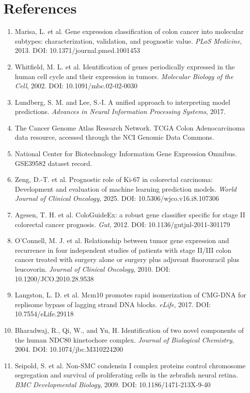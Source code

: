 \documentclass[11pt]{article}
\begin{document}
\section{References}
\begin{enumerate}
    \item Marisa, L. et al. Gene expression classification of colon cancer into molecular subtypes: characterization, validation, and prognostic value. \textit{PLoS Medicine}, 2013. DOI: 10.1371/journal.pmed.1001453
    \item Whitfield, M. L. et al. Identification of genes periodically expressed in the human cell cycle and their expression in tumors. \textit{Molecular Biology of the Cell}, 2002. DOI: 10.1091/mbc.02-02-0030
    \item Lundberg, S. M. and Lee, S.-I. A unified approach to interpreting model predictions. \textit{Advances in Neural Information Processing Systems}, 2017.
    \item The Cancer Genome Atlas Research Network. TCGA Colon Adenocarcinoma data resource, accessed through the NCI Genomic Data Commons.
    \item National Center for Biotechnology Information Gene Expression Omnibus. GSE39582 dataset record.
    \item Zeng, D.-T. et al. Prognostic role of Ki-67 in colorectal carcinoma: Development and evaluation of machine learning prediction models. \textit{World Journal of Clinical Oncology}, 2025. DOI: 10.5306/wjco.v16.i8.107306
    \item Agesen, T. H. et al. ColoGuideEx: a robust gene classifier specific for stage II colorectal cancer prognosis. \textit{Gut}, 2012. DOI: 10.1136/gutjnl-2011-301179
    \item O'Connell, M. J. et al. Relationship between tumor gene expression and recurrence in four independent studies of patients with stage II/III colon cancer treated with surgery alone or surgery plus adjuvant fluorouracil plus leucovorin. \textit{Journal of Clinical Oncology}, 2010. DOI: 10.1200/JCO.2010.28.9538
    \item Langston, L. D. et al. Mcm10 promotes rapid isomerization of CMG-DNA for replisome bypass of lagging strand DNA blocks. \textit{eLife}, 2017. DOI: 10.7554/eLife.29118
    \item Bharadwaj, R., Qi, W., and Yu, H. Identification of two novel components of the human NDC80 kinetochore complex. \textit{Journal of Biological Chemistry}, 2004. DOI: 10.1074/jbc.M310224200
    \item Seipold, S. et al. Non-SMC condensin I complex proteins control chromosome segregation and survival of proliferating cells in the zebrafish neural retina. \textit{BMC Developmental Biology}, 2009. DOI: 10.1186/1471-213X-9-40

\end{enumerate}
\end{document}
